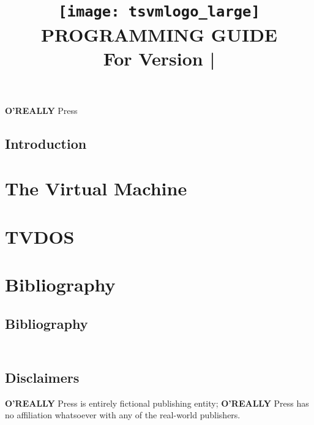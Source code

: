 \documentclass[10pt, stock, openany, chapter]{memoir}
\title{\vskip56pt \texttt{[image: tsvmlogo\_large]} \vskip3pt \titlefont\Huge\textbf{PROGRAMMING GUIDE} \\ \Large \vspace{1.2em} For Version \tsvmver\hspace{0.75em}|\hspace{0.75em}\theedition}
\date{}
\author{}
\newcommand{\thedos}{TVDOS}
\newcommand{\oreallypress}{\begingroup\hspace{0.083em}\large\textbf{O'REALLY\raisebox{1ex}{\scriptsize ?}} \large Press\endgroup}
\begin{document}
\maketitle{}
\thispagestyle{empty}
\vfill
\oreallypress

\newpage


\thispagestyle{empty}

\newpage

\setcounter{page}{3}
\tableofcontents*



\openright
\chapter{Introduction}

\openany

% 

\part{The Virtual Machine}


\part{\thedos}


\part*{Bibliography}

\chapter*{Bibliography}


{
\let\clearpage\relax
\chapter*{\ \\ Disclaimers}

\oreallypress{} is entirely fictional publishing entity; \oreallypress{} has no affiliation whatsoever with any of the real-world publishers.

}
\end{document}
